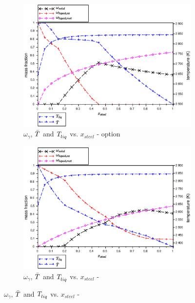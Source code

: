 \begin{figure}[H]
\centering
\begin{subfigure}[t]{0.48\textwidth}
 \centering \includegraphics[width=\textwidth]{figures/CalphadBasedEOSTest/OpenCalphad_NUCLEA9_eq/C32_1850_x-T.eps} 
\caption{$\omega_\gamma$, $\bar{\temperature{}}$ and $\temperature{liq}$ vs. $x_{steel}$ -  option} \label{fig:x-T_C32_1850_OpenCalphad_NUCLEA9_eq} 
\end{subfigure}
\hspace{0.01\textwidth}%
\begin{subfigure}[t]{0.48\textwidth}
 \centering \includegraphics[width=\textwidth]{figures/CalphadBasedEOSTest/OpenCalphad_NUCLEA9_separatedEqs/C32_1850_x-T.eps} 
\caption{$\omega_\gamma$, $\bar{\temperature{}}$ and $\temperature{liq}$ vs. $x_{steel}$ - } \label{fig:x-T_C32_1850_OpenCalphad_NUCLEA9_separatedEqs} 

\end{subfigure}
\end{figure}
